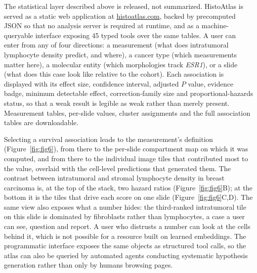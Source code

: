 The statistical layer described above is released, not summarized. HistoAtlas is
served as a static web application at
\href{https://histoatlas.com}{histoatlas.com}, backed by precomputed JSON so
that no analysis server is required at runtime, and as a machine-queryable
interface exposing 45 typed tools over the same tables. A user can enter from
any of four directions: a measurement (what does intratumoral lymphocyte density
predict, and where), a cancer type (which measurements matter here), a molecular
entity (which morphologies track \textit{ESR1}), or a slide (what does this case
look like relative to the cohort). Each association is displayed with its effect
size, confidence interval, adjusted $P$ value, evidence badge, minimum
detectable effect, correction-family size and proportional-hazards status, so
that a weak result is legible as weak rather than merely present. Measurement
tables, per-slide values, cluster assignments and the full association tables
are downloadable.

Selecting a survival association leads to the measurement's definition
(Figure~\ref{fig:fig6}), from
there to the per-slide compartment map on which it was computed, and from there
to the individual image tiles that contributed most to the value, overlaid with
the cell-level predictions that generated them. The contrast between
intratumoral and stromal lymphocyte density in breast carcinoma is, at the top
of the stack, two hazard ratios (Figure~\ref{fig:fig6}B); at the bottom it is
the tiles that drive each score on one slide (Figure~\ref{fig:fig6}C,D). The
same view also exposes what a number hides: the third-ranked intratumoral tile on
this slide is dominated by fibroblasts rather than lymphocytes, a case a user can
see, question and report. A user who distrusts a number can look at the cells
behind it, which is not possible for a resource built on learned embeddings.
The programmatic interface exposes the same objects as structured tool calls,
so the atlas can also be queried by automated agents conducting systematic
hypothesis generation rather than only by humans browsing pages.
